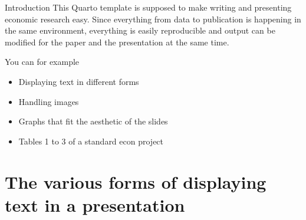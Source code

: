 \documentclass[11pt, aspectratio=169, t]{beamer}
\def\tightlist{}
\providecommand{\tightlist}{%
	\setlength{\itemsep}{0pt}\setlength{\parskip}{0pt}}
\begin{document}


\begin{frame}{Introduction}
\label{introduction}
This Quarto template is supposed to make writing and presenting economic
research easy. Since everything from data to publication is happening in
the same environment, everything is easily reproducible and output can
be modified for the paper and the presentation at the same time.

You can for example

\begin{itemize}
\tightlist
\item
  Displaying text in different forms
\item
  Handling images
\item
  Graphs that fit the aesthetic of the slides
\item
  Tables 1 to 3 of a standard econ project
\end{itemize}
\end{frame}

\section{The various forms of displaying text in a
presentation}\label{the-various-forms-of-displaying-text-in-a-presentation}
\end{document}
